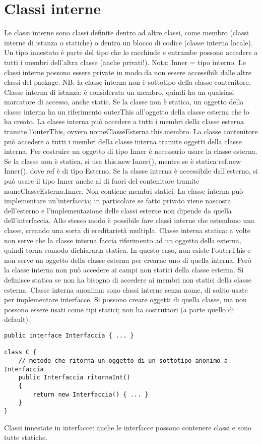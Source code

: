 \section{Classi interne}
Le classi interne sono classi definite dentro ad altre classi, come membro (classi interne di istanza o statiche) o dentro un blocco di codice (classe interna locale). Un tipo innestato è parte del tipo che lo racchiude e entrambe possono accedere a tutti i membri dell'altra classe (anche privati!). Nota: Inner = tipo interno.
Le classi interne possono essere private in modo da non essere accessibili dalle altre classi del package.
NB: la classe interna non è sottotipo della classe contenitore.
Classe interna di istanza: è considerata un membro, quindi ha un qualsiasi marcatore di accesso, anche static. Se la classe non è statica, un oggetto della classe interna ha un riferimento outerThis all'oggetto della classe esterna che lo ha creato.
La classe interna può accedere a tutti i membri della classe esterna tramite l'outerThis, ovvero nomeClasseEsterna.this.membro.
La classe contenitore può accedere a tutti i membri della classe interna tramite oggetti della classe interna.
Per costruire un oggetto di tipo Inner è necessario usare la classe esterna. Se la classe non è statica, si usa this.new Inner(), mentre se è statica ref.new Inner(), dove ref è di tipo Esterno.
Se la classe interna è accessibile dall'esterno, si può usare il tipo Inner anche al di fuori del contenitore tramite nomeClasseEsterna.Inner. 
Non contiene membri statici.
La classe interna può implementare un'interfaccia; in particolare se fatto privato viene nascosta dell'esterno e l'implementazione delle classi esterne non dipende da quella dell'interfaccia. Allo stesso modo è possibile fare classi interne che estendono una classe, creando una sorta di ereditarietà multipla.
Classe interna statica: a volte non serve che la classe interna faccia riferimento ad un oggetto della esterna, quindi torna comodo dichiararla statica. In questo caso, non esiste l'outerThis e non serve un oggetto della classe esterna per crearne uno di quella interna. Però la classe interna non può accedere ai campi non statici della classe esterna.
Si definisce statica se non ha bisogno di accedere ai membri non statici della classe esterna.
Classe interna anonima: sono classi interne senza nome, di solito usate per implementare interfacce. Si possono creare oggetti di quella classe, ma non possono essere usati come tipi statici; non ha costruttori (a parte quello di default).
\begin{lstlisting}
public interface Interfaccia { ... }

class C {
    // metodo che ritorna un oggetto di un sottotipo anonimo a Interfaccia
    public Interfaccia ritornaInt()
    {
        return new Interfaccia() { ... }
    }
}
\end{lstlisting} 
Classi innestate in interfacce: anche le interfacce possono contenere classi e sono tutte statiche.

